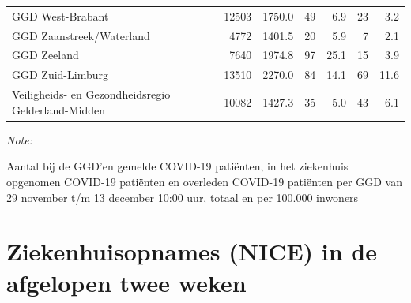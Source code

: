 \documentclass[
  english,
  man,floatsintext]{apa6}
\begin{document}
\begin{table}
\begin{threeparttable}
\begin{tabular}{lrrrrrr}
GGD West-Brabant & 12503 & 1750.0 & 49 & 6.9 & 23 & 3.2\\
GGD Zaanstreek/Waterland & 4772 & 1401.5 & 20 & 5.9 & 7 & 2.1\\
GGD Zeeland & 7640 & 1974.8 & 97 & 25.1 & 15 & 3.9\\
GGD Zuid-Limburg & 13510 & 2270.0 & 84 & 14.1 & 69 & 11.6\\
Veiligheids- en Gezondheidsregio Gelderland-Midden & 10082 & 1427.3 & 35 & 5.0 & 43 & 6.1\\
\bottomrule
\end{tabular}
\begin{tablenotes}
\item \textit{Note: } 
\item Aantal bij de GGD’en gemelde COVID-19 patiënten, in het ziekenhuis opgenomen COVID-19 patiënten en overleden COVID-19 patiënten per GGD van 29 november t/m 13 december 10:00 uur, totaal en per 100.000 inwoners
\end{tablenotes}
\end{threeparttable}
\endgroup{}
\end{table}

\newpage

\hypertarget{ziekenhuisopnames-nice-in-de-afgelopen-twee-weken}{%
\section{Ziekenhuisopnames (NICE) in de afgelopen twee weken}\label{ziekenhuisopnames-nice-in-de-afgelopen-twee-weken}}
\end{document}
